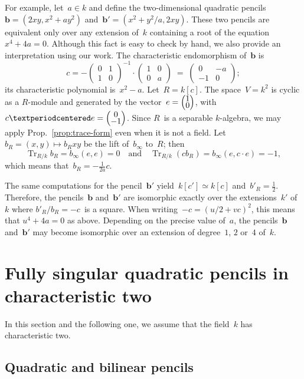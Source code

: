 \documentclass{article}%
\def\mat#1{\begin{pmatrix}#1\end{pmatrix}}
\DeclareMathOperator\Tr{Tr}
\begin{document}
For example, let~$a ∈ k$ and define the two-dimensional
quadratic pencils~$\bm{b} = (2 x y, x^2 + a y^2)$
and~$\bm{b'} = (x^2 + y^2/a, 2 x y)$.
These two pencils are equivalent only over any extension of~$k$
containing a root of the equation~$x^4 + 4 a = 0$.
Although this fact is easy to check by hand,
we also provide an interpretation using our work.
The characteristic endomorphism of~$\bm{b}$ is
\begin{equation*}
c = -\mat{0&1\\1&0}^{-1} · \mat{1&0\\0&a} \;=\; \mat{0 & -a\\-1 & 0};
\end{equation*}
its characteristic polynomial is~$x^2 - a$.
Let~$R = k[c]$.
The space~$V = k^2$ is cyclic as a $R$-module and generated by the
vector~$e = \def\arraystretch{.5}\mat{1\\0}$,
with~$c · e = \def\arraystretch{.5}\mat{0\\-1}$.
Since $R$~is a separable $k$-algebra,
we may apply Prop.~\ref{prop:trace-form} even when it is not a field.
Let~$b_R = (x, y) ↦ b_R x y$ be the lift of~$b_{∞}$ to~$R$; then
\begin{equation}
\Tr_{R/k} b_R = b_{∞} (e, e) = 0
\quad\text{and}\quad
\Tr_{R/k} (c b_R) = b_{∞} (e, c·e) = -1,
\end{equation}
which means that~$b_R = -\frac{1}{2 a} c$.

The same computations for the pencil~$\bm{b'}$
yield~$k[c'] ≃ k[c]$ and~$b'_R = \frac{1}{2}$.
Therefore, the pencils~$\bm{b}$ and~$\bm{b'}$
are isomorphic exactly over the extensions~$k'$ of~$k$
where $b'_R/b_R = -c$~is a square.
When writing~$-c = (u/2 + v c)^{2}$,
this means that $u^4 + 4 a = 0$ as above.
Depending on the precise value of~$a$, the pencils~$\bm{b}$ and~$\bm{b'}$
may become isomorphic over an extension of degree~$1$, $2$ or~$4$ of~$k$.




\section{Fully singular quadratic pencils in characteristic two}%
\label{S:quad-sing}
In this section and the following one, we assume that the field~$k$ has
characteristic two.

\subsection{Quadratic and bilinear pencils}%
\end{document}

